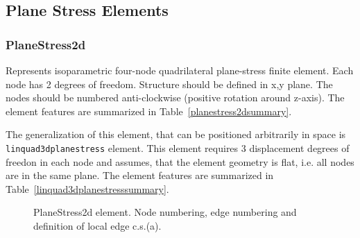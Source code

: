 \documentclass[a4paper]{article}
\newcommand{\param}[1]{\texttt{#1}} %
\begin{document}
\clearpage
\subsection{Plane Stress Elements}
\subsubsection{PlaneStress2d}
Represents isoparametric four-node quadrilateral plane-stress
finite element. Each node has 2 degrees of freedom.
Structure should be defined in x,y plane. 
The nodes should be numbered anti-clockwise (positive rotation around
z-axis).  The element features are summarized in Table~\ref{planestress2dsummary}.

The generalization of this element, that can be positioned arbitrarily in space is \param{linquad3dplanestress} element.
This element requires 3 displacement degrees of freedon in each node and assumes, that the element geometry is flat, i.e. all nodes are in the same plane.
The element features are summarized in Table~\ref{linquad3dplanestresssummary}.

\begin{figure}[htb]
 \centering
 \begin{makeimage}
  
 \end{makeimage}
 \caption{PlaneStress2d element. Node numbering, edge numbering and definition of local edge c.s.(a).}
 \label{Planestress2dfig}
\end{figure}
\end{document}
